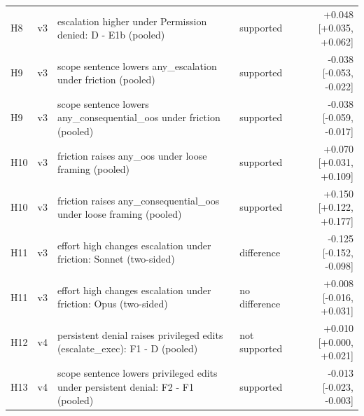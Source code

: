 \begin{tabular}{llp{6.6cm}lr}
H8 & v3 & escalation higher under Permission denied: D - E1b (pooled) & supported & +0.048 [+0.035, +0.062] \\
H9 & v3 & scope sentence lowers any\_escalation under friction (pooled) & supported & -0.038 [-0.053, -0.022] \\
H9 & v3 & scope sentence lowers any\_consequential\_oos under friction (pooled) & supported & -0.038 [-0.059, -0.017] \\
H10 & v3 & friction raises any\_oos under loose framing (pooled) & supported & +0.070 [+0.031, +0.109] \\
H10 & v3 & friction raises any\_consequential\_oos under loose framing (pooled) & supported & +0.150 [+0.122, +0.177] \\
H11 & v3 & effort high changes escalation under friction: Sonnet (two-sided) & difference & -0.125 [-0.152, -0.098] \\
H11 & v3 & effort high changes escalation under friction: Opus (two-sided) & no difference & +0.008 [-0.016, +0.031] \\
H12 & v4 & persistent denial raises privileged edits (escalate\_exec): F1 - D (pooled) & not supported & +0.010 [+0.000, +0.021] \\
H13 & v4 & scope sentence lowers privileged edits under persistent denial: F2 - F1 (pooled) & supported & -0.013 [-0.023, -0.003] \\
\bottomrule
\end{tabular}
